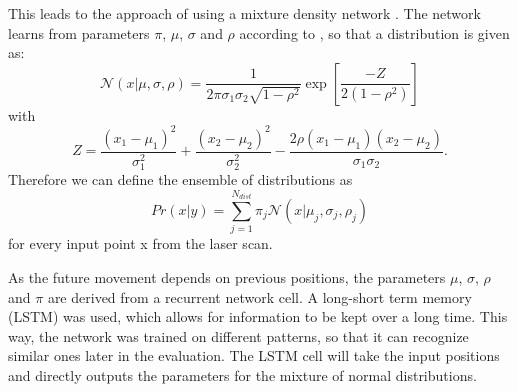 This leads to the approach of using a mixture density network \cite{bishop1994mixture}. The network learns from parameters $\pi$, $\mu$, $\sigma$ and $\rho$ according to \cite{graves2013generating}, so that a distribution is given as:
\begin{equation}
	\mathcal{N}(x|\mu,\sigma,\rho) = \frac{1}{2\pi\sigma_1\sigma_2\sqrt{1-\rho^2}} \exp\left[ \frac{-Z}{2(1-\rho^2)} \right]
\end{equation}
with
\begin{equation}
	Z = \frac{(x_1 - \mu_1)^2}{\sigma_1^2} + \frac{(x_2 - \mu_2)^2}{\sigma_2^2} - \frac{2\rho(x_1-\mu_1)(x_2-\mu_2)}{\sigma_1\sigma_2}.
\end{equation}
Therefore we can define the ensemble of distributions as
\begin{equation}
	Pr(x|y) = \sum_{j=1}^{N_{dist}} \pi_j \mathcal{N}(x|\mu_j,\sigma_j,\rho_j)
\end{equation}
for every input point x from the laser scan.

As the future movement depends on previous positions, the parameters $\mu$, $\sigma$, $\rho$ and $\pi$ are derived from a recurrent network cell. A long-short term memory (LSTM) was used, which allows for information to be kept over a long time. This way, the network was trained on different patterns, so that it can recognize similar ones later in the evaluation. The LSTM cell will take the input positions and directly outputs the parameters for the mixture of normal distributions.